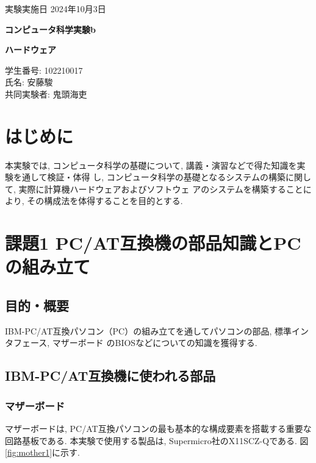 \documentclass{ltjsarticle} %
\begin{document}
\thispagestyle{empty}
\begin{flushright}
{\large 実験実施日 2024年10月3日{\hspace{5cm}}} 
\end{flushright}

\vspace*{\fill}
\centering
{\Huge\bf コンピュータ科学実験b}
\vspace*{1cm}

{\huge\bf ハードウェア}
\vspace*{\fill}

\vspace*{\fill}

\vspace*{\fill}

\begin{flushright}
{\large 学生番号: 102210017} \\ %
{\large 氏名: 安藤駿} \\
{\large 共同実験者: 鬼頭海吏}
\end{flushright}

\clearpage

\addtocounter{page}{-1}
\raggedright
\setlength{\parindent}{1em}
\section{はじめに}
本実験では, コンピュータ科学の基礎について, 講義・演習などで得た知識を実験を通して検証・体得
し, コンピュータ科学の基礎となるシステムの構築に関して, 実際に計算機ハードウェアおよびソフトウェ
アのシステムを構築することにより, その構成法を体得することを目的とする.

\section{課題1 PC/AT互換機の部品知識とPCの組み⽴て}

\subsection{目的・概要}
IBM-PC/AT互換パソコン（PC）の組み⽴てを通してパソコンの部品, 標準インタフェース, マザーボード
のBIOSなどについての知識を獲得する. 

\subsection{IBM-PC/AT互換機に使われる部品}

\subsubsection{マザーボード}
マザーボードは, PC/AT互換パソコンの最も基本的な構成要素を搭載する重要な回路基板である.
本実験で使用する製品は,  Supermicro社のX11SCZ-Qである. 図\ref{fig:mother1}に示す.
\end{document}
